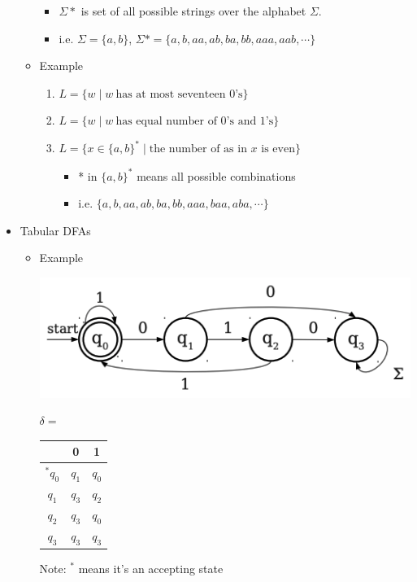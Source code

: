 \documentclass[12pt]{article}
\begin{document}
\begin{itemize}
\begin{itemize}
        \begin{itemize}
            \item  $\Sigma *$ is set of all possible strings over the alphabet $\Sigma$.
            \item i.e. $\Sigma = \{a,b\}$, $\Sigma* = \{a,b,aa,ab,ba,bb,aaa,aab,\cdots\}$
        \end{itemize}
        \item Example
        \begin{enumerate}[1.]
        \item $L = \{w \mid w\:\text{has at most seventeen 0's}\}$
        \item $L = \{w \mid w\:\text{has equal number of 0's and 1's}\}$
        \item $L = \{x \in \{a,b\}^* \mid \text{the number of as in $x$ is even}\}$
        \begin{itemize}
            \item * in $\{a,b\}^*$ means all possible combinations
            \item i.e. $\{a,b,aa,ab,ba,bb,aaa,baa,aba,\cdots\}$
        \end{itemize}
        \end{enumerate}
    \end{itemize}
    \item Tabular DFAs
    \begin{itemize}
        \item Example

        \begin{center}
        \includegraphics[width=\linewidth]{images/worksheet_8_notes_15.png}
        \end{center}

        \bigskip

        \begin{center}
        $\delta =$ \begin{tabular}{|c|c|c|}
        \hline
         & 0 & 1\\
        \hline
        $^*q_0$ & $q_1$ & $q_0$\\
        $q_1$ & $q_3$ & $q_2$\\
        $q_2$ & $q_3$ & $q_0$\\
        $q_3$ & $q_3$ & $q_3$\\
        \hline
        \end{tabular}

        \bigskip

        Note: $^*$ means it's an accepting state
        \end{center}

    \end{itemize}
\end{itemize}
\end{document}
